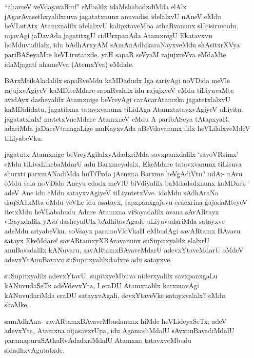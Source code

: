 \begin{artha}%
``ahameV veVda\c savaRmf" eMbalilx idaMshabadxdiMda elAlx jAgarAvasethxyalilxruva jagatatxnunx anuvadisi idelalxvU nAneV eMdu heVLutAtx Atamxnalilx idelalxvU kalipxtaveMba athaRvanunx sUcisiruvudu, nijavAgi jaDavAda jagatitxgU cidUrxpanAda AtamxnigU Ekatavxvu hoMduvudilalx, idu bAdhArxyAM sAmAnAdhikaraNayxveMdu shAsitxrXVya pariBASeyaMte heVLirutatxde. yaH sapaR seVyaM rajujxreVva eMdaMte idaMjagatf ahameVva (AtemxYva) eMdide.
\end{artha}

\begin{artha}
BArxMtikAladalilx sapaRveMdu kaMDadudx Iga sariyAgi noVDida meVle rajujxvAgiyeV kaMDiteMdare sapaRvalalx idu rajujxveV eMdu tiLiyuvaMte avidAyx dasheyalilx Atamxnige beVreyAgi carAcarAtamxka jagatetxlalxvU kaMDididxtu, jagatitxna tatavxvanunx tiLidAga AtamxtatavxvAgiyeV uLiyitu. jagatatxlalx! matetxVneMdare AtamxneV eMdu A paribASeya tAtapxyaR. adariMda jaDaceVtanagaLige muKayxvAda aBeVdavanunx ililx heVLilalxveMdeV tiLiyabeVku. 
\end{artha}

\begin{artha}
jagatutx Atamxnige beVreyAgilalxvAdadxriMda savxpanxdalilx `savoVR\s simx' eMdu tiLivaLikebaMdarU adu Barxmeyalalx, EkeMdare tatavxvanunx tiLisuva shurxti parxmANadiMda huTiTxda jAcnxna Barxme heVgAdiVtu? udA:- nAvu oMdu sala noVDida Aneyu edadx meVlU biVdiyalilx baMdadadxnunx kaMDarU adeV Ane idu eMdu satayxvAgiyeV tiLiyutetxVve. idoMdu sAdhAraNa daqSATxMta oMdu veVLe idu asatayx, sapxpanxgajavu ecacxrina gajadaMteyeV itetxMdu heVLabahudu Adare Atamxna viSayadalilx avana sAvARtayx viSayxdalilx yAva dasheyalUlx bAdhitavAgade uLiyuvudariMda satayxve adeMdu ariyabeVku. soV\s sayx paramoVloVkaH eMbudAgi savARtamx BAvavu satayx EkeMdare! savARtamxyXBAvavanunx suSupitxyalilx elalxrU anuBavadalilx kANuvaru, savARtamxBAvaveMdarU adevxYtaveMdarU oMdeV adevxYtAnuBavavu suSupitxyalilxdadxre adu satayxve. 
\end{artha}


\begin{artha}
suSupitxyalilx adevxYtavU, supitxyeMbuva niderxyalilx savxpanxgaLu kANuvudaSeTx adeVdevxYta, I eraDU Atamxnalilx karxmavAgi kANuvudariMda eraDU satayxvAgali, devxYtaveVke satayxvalalx? eMdu shaMke. 
\end{artha}

\begin{artha}
samAdhAna- savARtamxBAvaveMbudanunx hiMde heVLideyaSeTx; adeV adevxYta, Atamxna nijasavxrUpa, idu AgamadiMdalU sAvxnuBavadiMdalU paramapuruSAthaRvAdadxriMdalU Atamxna tatavxveMbudu sidadhxvAgutatxde. 
\end{artha}

